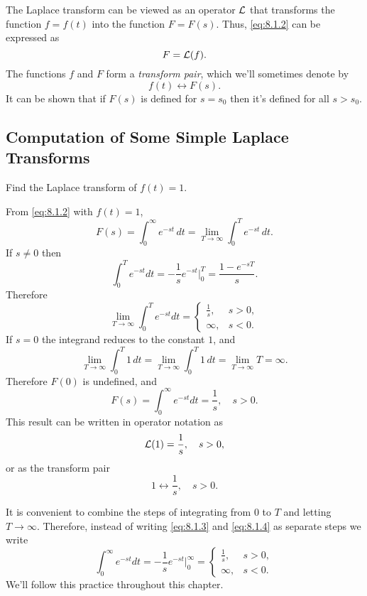 \documentclass{ximera}
\begin{document}
The Laplace transform can be viewed as an operator ${\cal L}$ that
transforms the function $f=f(t)$  into the function $F=F(s)$. Thus,
\eqref{eq:8.1.2} can be expressed as
$$
F={\cal L}(f).
$$
The functions $f$ and $F$ form a \textit{transform pair}, which we'll
sometimes denote by
$$
f(t)\leftrightarrow F(s).
$$
It can be shown that if $F(s)$ is defined for $s=s_0$ then it's defined
for all $s>s_0$. %

\subsection*{Computation of Some Simple Laplace Transforms}

\begin{example}\label{example:8.1.1} 
 Find the Laplace transform of  $f(t)=1$.


\begin{explanation}
 From  \eqref{eq:8.1.2} with $f(t)=1$,
$$
F(s)=\int_0^\infty e^{-st}\,dt=\lim_{T\rightarrow\infty}\int_0^T e^{-st}\,
dt.
$$
If $s\neq 0$ then
\begin{equation}\label{eq:8.1.3}
\int_0^T e^{-st}dt=-\frac{1}{s}e^{-st}\Big|_0^T=\frac{1-e^{-sT}}{s}.
\end{equation}
Therefore
\begin{equation}\label{eq:8.1.4}
\lim_{T\rightarrow\infty}\int_0^T e^{-st}dt=\left\{\begin{array}{rr}
\frac{1}{s}, &   s>0,\\
\infty, &  s<0.
\end{array}\right.
\end{equation}
If $s=0$  the integrand reduces to the constant $1$, and
$$
\lim_{T\rightarrow\infty}\int_0^T 1\,dt=\lim_{T\rightarrow\infty}\int_0^T 1\,dt=
\lim_{T\rightarrow\infty}T=\infty.
$$
Therefore $F(0)$ is undefined, and
$$
F(s)=\int_0^\infty e^{-st}dt=\frac{1}{s},\quad s>0.
$$
This result can be written in operator notation as
$$
{\cal L}(1)=\frac{1}{s},\quad s>0,
$$
or as the transform pair
$$
1\leftrightarrow\frac{1}{s},\quad s>0.
$$
\end{explanation}
\end{example}
\begin{remark}
It is convenient to combine the steps of integrating from $0$ to $T$
and letting $T\rightarrow\infty$. Therefore, instead of writing \eqref{eq:8.1.3}
and \eqref{eq:8.1.4} as separate steps we write
$$
\int_0^\infty e^{-st}dt=-\frac{1}{s} e^{-st}\Big|_0^\infty=
\left\{\begin{array}{rr}\frac{1}{s}, & s>0,\\\infty,&s<
0.\end{array}\right.
$$
We'll follow this practice throughout this chapter.
\end{remark}
\end{document}
